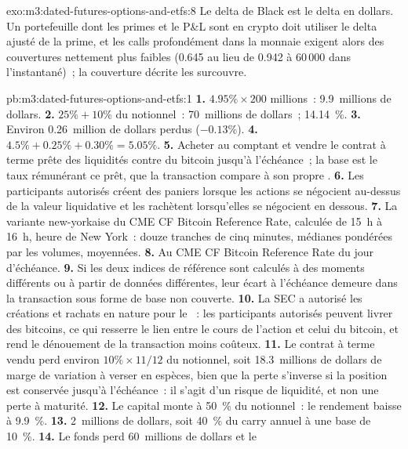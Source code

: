 \begin{solution}{exo:m3:dated-futures-options-and-etfs:8}
Le delta de Black est le delta en dollars. Un portefeuille dont les primes et le P\&L sont en crypto doit utiliser le delta ajusté de la prime, et les calls profondément dans la monnaie
exigent alors des couvertures nettement plus faibles (0.645 au lieu de 0.942 à 60\,000 dans l'instantané)~; la couverture décrite les surcouvre.
\end{solution}

\begin{solution}{pb:m3:dated-futures-options-and-etfs:1}
\textbf{1.} $4.95\% \times 200$ millions~: 9.9~millions de dollars. \textbf{2.} $25\% + 10\%$ du notionnel~: 70~millions de dollars~; 14.14~\%. \textbf{3.}
Environ 0.26~million de dollars perdus ($-0.13\%$). \textbf{4.} $4.5\% + 0.25\% + 0.30\% = 5.05\%$. \textbf{5.} Acheter au comptant et vendre le contrat à terme
prête des liquidités contre du bitcoin jusqu'à l'échéance~; la base est le taux rémunérant ce prêt, que la transaction compare à son propre
. \textbf{6.} Les participants autorisés créent des paniers lorsque les actions se négocient au-dessus de la valeur liquidative et les rachètent lorsqu'elles se négocient en dessous. \textbf{7.}
La variante new-yorkaise du CME CF Bitcoin Reference Rate, calculée de 15~h à 16~h, heure de New York~: douze tranches de cinq minutes,
médianes pondérées par les volumes, moyennées. \textbf{8.} Au CME CF Bitcoin Reference Rate du jour d'échéance. \textbf{9.} Si les deux
indices de référence sont calculés à des moments différents ou à partir de données différentes, leur écart à l'échéance demeure dans la transaction sous forme de base non couverte.
\textbf{10.} La SEC a autorisé les créations et rachats en nature pour le ~: les participants autorisés peuvent livrer des bitcoins, ce qui
resserre le lien entre le cours de l'action et celui du bitcoin, et rend le dénouement de la transaction moins coûteux. \textbf{11.} Le contrat à terme vendu perd
environ $10\% \times 11/12$ du notionnel, soit 18.3~millions de dollars de marge de variation à verser en espèces, bien que la perte s'inverse si la
position est conservée jusqu'à l'échéance~: il s'agit d'un risque de liquidité, et non une perte à maturité. \textbf{12.} Le capital monte à 50~\% du notionnel~: le rendement
baisse à 9.9~\%. \textbf{13.} 2~millions de dollars, soit 40~\% du carry annuel à une base de 10~\%. \textbf{14.} Le fonds perd 60~millions de dollars et le

\end{solution}
